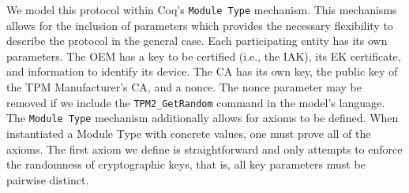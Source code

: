 We model this protocol within Coq's \verb|Module Type| mechanism. This mechanisms allows for the inclusion of parameters which provides the necessary flexibility to describe the protocol in the general case. Each participating entity has its own parameters. The OEM has a key to be certified (i.e., the IAK), its EK certificate, and information to identify its device. The CA has its own key, the public key of the TPM Manufacturer's CA, and a nonce. The nonce parameter may be removed if we include the \verb|TPM2_GetRandom| command in the model's language. The \verb|Module Type| mechanism additionally allows for axioms to be defined. When instantiated a Module Type with concrete values, one must prove all of the axioms. The first axiom we define is straightforward and only attempts to enforce the randomness of cryptographic keys, that is, all key parameters must be pairwise distinct.





